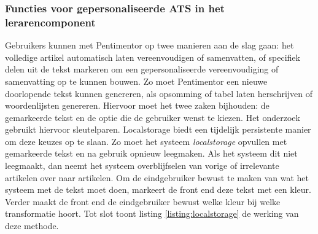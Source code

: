 \subsubsection{Functies voor gepersonaliseerde ATS in het lerarencomponent}

Gebruikers kunnen met Pentimentor op twee manieren aan de slag gaan: het volledige artikel automatisch laten vereenvoudigen of samenvatten, of specifiek delen uit de tekst markeren om een gepersonaliseerde vereenvoudiging of samenvatting op te kunnen bouwen. Zo moet Pentimentor een nieuwe doorlopende tekst kunnen genereren, als opsomming of tabel laten herschrijven of woordenlijsten genereren. Hiervoor moet het twee zaken bijhouden: de gemarkeerde tekst en de optie die de gebruiker wenst te kiezen. Het onderzoek gebruikt hiervoor sleutelparen. Localstorage biedt een tijdelijk persistente manier om deze keuzes op te slaan. Zo moet het systeem \textit{localstorage} opvullen met gemarkeerde tekst en na gebruik opnieuw leegmaken. Als het systeem dit niet leegmaakt, dan neemt het systeem overblijfselen van vorige of irrelevante artikelen over naar artikelen. Om de eindgebruiker bewust te maken van wat het systeem met de tekst moet doen, markeert de front end deze tekst met een kleur. Verder maakt de front end de eindgebruiker bewust welke kleur bij welke transformatie hoort. Tot slot toont listing \ref{listing:localstorage} de werking van deze methode.

